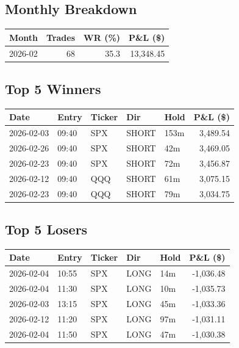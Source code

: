 \documentclass[11pt,a4paper,twoside]{article}
\begin{document}
\subsection{Monthly Breakdown}
\noindent\begin{center}
\begin{tabular}{>{\color{txtmain}}l rrr}
\toprule
\rowcolor{cardbg}
\textbf{Month} & \textbf{Trades} & \textbf{WR (\%)} & \textbf{P\&L (\$)} \\
\midrule
2026-02 & 68 & 35.3 & \textcolor{wingreen}{13,348.45} \\
\bottomrule
\end{tabular}
\end{center}
\subsection{Top 5 Winners}
\noindent\begin{center}
\begin{tabular}{>{\color{txtmain}}l llll r}
\toprule
\rowcolor{cardbg}
\textbf{Date} & \textbf{Entry} & \textbf{Ticker} & \textbf{Dir} & \textbf{Hold} & \textbf{P\&L (\$)} \\
\midrule
2026-02-03 & 09:40 & SPX & SHORT & 153m & \textcolor{wingreen}{3,489.54} \\
2026-02-26 & 09:40 & SPX & SHORT & 42m & \textcolor{wingreen}{3,469.05} \\
2026-02-23 & 09:40 & SPX & SHORT & 72m & \textcolor{wingreen}{3,456.87} \\
2026-02-12 & 09:40 & QQQ & SHORT & 61m & \textcolor{wingreen}{3,075.15} \\
2026-02-23 & 09:40 & QQQ & SHORT & 79m & \textcolor{wingreen}{3,034.75} \\
\bottomrule
\end{tabular}
\end{center}
\subsection{Top 5 Losers}
\noindent\begin{center}
\begin{tabular}{>{\color{txtmain}}l llll r}
\toprule
\rowcolor{cardbg}
\textbf{Date} & \textbf{Entry} & \textbf{Ticker} & \textbf{Dir} & \textbf{Hold} & \textbf{P\&L (\$)} \\
\midrule
2026-02-04 & 10:55 & SPX & LONG & 14m & \textcolor{lossred}{-1,036.48} \\
2026-02-04 & 11:30 & SPX & LONG & 10m & \textcolor{lossred}{-1,035.73} \\
2026-02-03 & 13:15 & SPX & LONG & 45m & \textcolor{lossred}{-1,033.36} \\
2026-02-12 & 11:20 & SPX & LONG & 97m & \textcolor{lossred}{-1,031.11} \\
2026-02-04 & 11:50 & SPX & LONG & 47m & \textcolor{lossred}{-1,030.38} \\
\bottomrule
\end{tabular}
\end{center}
\clearpage
\end{document}
